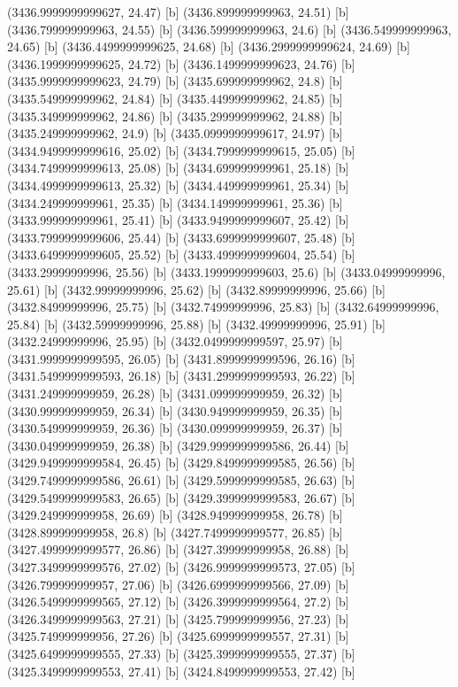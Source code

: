 {{{(3436.9999999999627, 24.47) [b] 
(3436.899999999963, 24.51) [b] 
(3436.799999999963, 24.55) [b] 
(3436.599999999963, 24.6) [b] 
(3436.549999999963, 24.65) [b] 
(3436.4499999999625, 24.68) [b] 
(3436.2999999999624, 24.69) [b] 
(3436.1999999999625, 24.72) [b] 
(3436.1499999999623, 24.76) [b] 
(3435.9999999999623, 24.79) [b] 
(3435.699999999962, 24.8) [b] 
(3435.549999999962, 24.84) [b] 
(3435.449999999962, 24.85) [b] 
(3435.349999999962, 24.86) [b] 
(3435.299999999962, 24.88) [b] 
(3435.249999999962, 24.9) [b] 
(3435.0999999999617, 24.97) [b] 
(3434.9499999999616, 25.02) [b] 
(3434.7999999999615, 25.05) [b] 
(3434.7499999999613, 25.08) [b] 
(3434.699999999961, 25.18) [b] 
(3434.4999999999613, 25.32) [b] 
(3434.449999999961, 25.34) [b] 
(3434.249999999961, 25.35) [b] 
(3434.149999999961, 25.36) [b] 
(3433.999999999961, 25.41) [b] 
(3433.9499999999607, 25.42) [b] 
(3433.7999999999606, 25.44) [b] 
(3433.6999999999607, 25.48) [b] 
(3433.6499999999605, 25.52) [b] 
(3433.4999999999604, 25.54) [b] 
(3433.29999999996, 25.56) [b] 
(3433.1999999999603, 25.6) [b] 
(3433.04999999996, 25.61) [b] 
(3432.99999999996, 25.62) [b] 
(3432.89999999996, 25.66) [b] 
(3432.84999999996, 25.75) [b] 
(3432.74999999996, 25.83) [b] 
(3432.64999999996, 25.84) [b] 
(3432.59999999996, 25.88) [b] 
(3432.49999999996, 25.91) [b] 
(3432.24999999996, 25.95) [b] 
(3432.0499999999597, 25.97) [b] 
(3431.9999999999595, 26.05) [b] 
(3431.8999999999596, 26.16) [b] 
(3431.5499999999593, 26.18) [b] 
(3431.2999999999593, 26.22) [b] 
(3431.249999999959, 26.28) [b] 
(3431.099999999959, 26.32) [b] 
(3430.999999999959, 26.34) [b] 
(3430.949999999959, 26.35) [b] 
(3430.549999999959, 26.36) [b] 
(3430.099999999959, 26.37) [b] 
(3430.049999999959, 26.38) [b] 
(3429.9999999999586, 26.44) [b] 
(3429.9499999999584, 26.45) [b] 
(3429.8499999999585, 26.56) [b] 
(3429.7499999999586, 26.61) [b] 
(3429.5999999999585, 26.63) [b] 
(3429.5499999999583, 26.65) [b] 
(3429.3999999999583, 26.67) [b] 
(3429.249999999958, 26.69) [b] 
(3428.949999999958, 26.78) [b] 
(3428.899999999958, 26.8) [b] 
(3427.7499999999577, 26.85) [b] 
(3427.4999999999577, 26.86) [b] 
(3427.399999999958, 26.88) [b] 
(3427.3499999999576, 27.02) [b] 
(3426.9999999999573, 27.05) [b] 
(3426.799999999957, 27.06) [b] 
(3426.6999999999566, 27.09) [b] 
(3426.5499999999565, 27.12) [b] 
(3426.3999999999564, 27.2) [b] 
(3426.3499999999563, 27.21) [b] 
(3425.799999999956, 27.23) [b] 
(3425.749999999956, 27.26) [b] 
(3425.6999999999557, 27.31) [b] 
(3425.6499999999555, 27.33) [b] 
(3425.3999999999555, 27.37) [b] 
(3425.3499999999553, 27.41) [b] 
(3424.8499999999553, 27.42) [b] 
}}}
